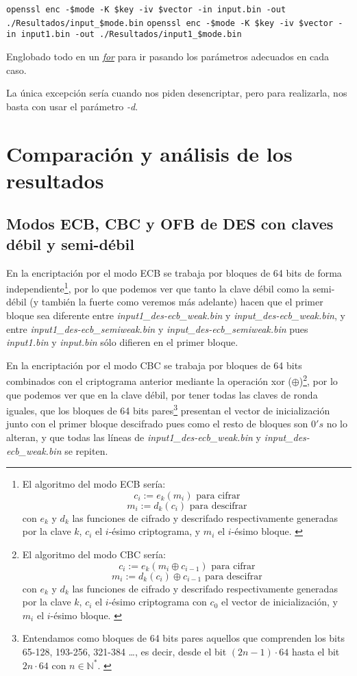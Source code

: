 \documentclass[a4paper, 11pt]{article}
\begin{document}
		\begin{small}
			\verb|openssl enc -$mode -K $key -iv $vector -in input.bin -out ./Resultados/input_$mode.bin|
			\verb|openssl enc -$mode -K $key -iv $vector -in input1.bin -out ./Resultados/input1_$mode.bin|
		\end{small}
		
		Englobado todo en un \href{http://manpages.ubuntu.com/manpages/zesty/en/man3/for.3tcl.html}{\textit{for}} para ir
		pasando los parámetros adecuados en cada caso.
		
		La única excepción sería cuando nos piden desencriptar, pero para realizarla, nos basta con usar el parámetro \textit{-d}.
	
\section{Comparación y análisis de los resultados}
	\subsection{Modos ECB, CBC y OFB de DES con claves débil y semi-débil}
		En la encriptación por el modo ECB se trabaja por bloques de 64 bits de forma independiente\footnote{El algoritmo del
		modo ECB sería: \[c_i := e_k(m_i) \text{ para cifrar}\] \[m_i := d_k(c_i) \text{ para descifrar}\] con $e_k$ y $d_k$
		las funciones de cifrado y descrifado respectivamente generadas por la clave $k$, $c_i$ el $i$-ésimo criptograma, y
		$m_i$ el $i$-ésimo bloque. \label{ecb}}, por lo que podemos ver que tanto la clave débil como la semi-débil (y también
		la fuerte como veremos más adelante) hacen que el primer bloque sea diferente entre	\textit{input1\_des-ecb\_weak.bin}
		y \textit{input\_des-ecb\_weak.bin}, y entre \textit{input1\_des-ecb\_semiweak.bin} y \textit{input\_des-ecb\_semiweak.bin}
		pues \textit{input1.bin} y \textit{input.bin} sólo difieren en el primer bloque.
		
		En la encriptación por el modo CBC se trabaja por bloques de 64 bits combinados con el criptograma anterior mediante la
		operación xor ($\oplus$)\footnote{El algoritmo del modo CBC sería: \[c_i := e_k(m_i \oplus c_{i-1})\text{ para cifrar}\]
		\[m_i := d_k(c_i) \oplus c_{i-1} \text{ para descifrar}\] con $e_k$ y $d_k$ las funciones de cifrado y descrifado
		respectivamente generadas por la clave $k$, $c_i$ el $i$-ésimo criptograma con $c_0$ el vector de inicialización, y $m_i$
		el $i$-ésimo bloque. \label{cbc}}, por lo que podemos ver que en la clave débil, por tener todas las claves de ronda
		iguales, que los bloques de 64 bits pares\footnote{Entendamos como bloques de 64 bits pares aquellos que comprenden
		los bits 65-128, 193-256, 321-384 \dots, es decir, desde el bit $(2n-1) \cdot 64$ hasta el bit $2n \cdot 64$ con $n
		\in \mathbb{N}^*$. \label{bits-parity}} presentan el vector de inicialización junto con el primer bloque descifrado
		pues como el resto de bloques son $0's$ no lo alteran, y que todas las líneas de \textit{input1\_des-ecb\_weak.bin}
		y \textit{input\_des-ecb\_weak.bin} se repiten.
\end{document}
